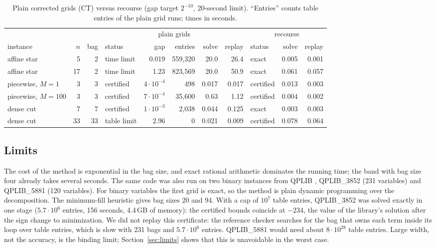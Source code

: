 \begin{table}[t]
\centering\small
\setlength{\tabcolsep}{4pt}
\caption{Plain corrected grids (CT) versus recourse (gap target $2^{-10}$,
20-second limit). ``Entries'' counts table entries of the plain grid runs;
times in seconds.}\label{tab:recourse}
\begin{tabular}{lrrlrrrrlrr}
\toprule
&&&\multicolumn{5}{c}{plain grids}&\multicolumn{3}{c}{recourse}\\
\cmidrule(lr){4-8}\cmidrule(lr){9-11}
instance & $n$ & bag & status & gap & entries & solve & replay & status & solve & replay\\
\midrule
affine star & 5 & 2 & time limit & 0.019 & 559{,}320 & 20.0 & 26.4 & exact & 0.005 & 0.001\\
affine star & 17 & 2 & time limit & 1.23 & 823{,}569 & 20.0 & 50.9 & exact & 0.061 & 0.057\\
piecewise, $M=1$ & 3 & 3 & certified & $4\cdot10^{-4}$ & 498 & 0.017 & 0.017 & certified & 0.013 & 0.003\\
piecewise, $M=100$ & 3 & 3 & certified & $7\cdot10^{-4}$ & 35{,}600 & 0.63 & 1.12 & certified & 0.004 & 0.002\\
dense cut & 7 & 7 & certified & $1\cdot10^{-3}$ & 2{,}038 & 0.044 & 0.125 & exact & 0.003 & 0.003\\
dense cut & 33 & 33 & table limit & 2.96 & 0 & 0.021 & 0.009 & certified & 0.078 & 0.064\\
\bottomrule
\end{tabular}
\end{table}

\subsection{Limits}\label{sec:comp-limits}
The cost of the method is exponential in the bag size, and exact rational
arithmetic dominates the running time; the band with bag size four already
takes several seconds. The same code was also run on two binary instances from
QPLIB \cite{FuriniEtAl2019}, QPLIB\_3852 (231 variables) and QPLIB\_5881 (120
variables). For binary variables the first grid is exact, so the method is
plain dynamic programming over the decomposition. The minimum-fill heuristic
gives bag sizes 20 and 94. With a cap of $10^7$ table entries, QPLIB\_3852 was
solved exactly in one stage ($5.7\cdot10^6$ entries, 156 seconds, 4.4\,GB of
memory): the certified bounds coincide at $-234$, the value of the library's
solution after the sign change to minimization. We did not replay this
certificate: the reference checker searches for the bag that owns each term
inside its loop over table entries, which is slow with 231 bags and
$5.7\cdot10^6$ entries.
QPLIB\_5881 would need about $8\cdot10^{28}$ table entries. Large width, not
the accuracy, is the binding limit; Section~\ref{sec:limits} shows that this
is unavoidable in the worst case.
